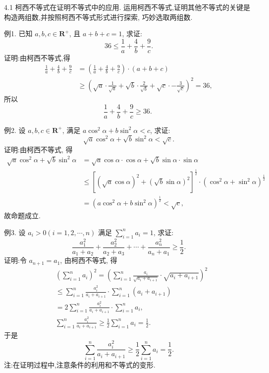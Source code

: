 
4.1 柯西不等式在证明不等式中的应用.
运用柯西不等式,证明其他不等式的关键是构造两组数,并按照柯西不等式形式进行探索, 巧妙选取两组数.



例1. 已知 $a, b, c \in \mathbf{R}^{+}$, 且 $a+b+c=1$, 求证:
$$
36 \leqslant \frac{1}{a}+\frac{4}{b}+\frac{9}{c} .
$$
证明:由柯西不等式,得
$$
\begin{aligned}
\frac{1}{a}+\frac{4}{b}+\frac{9}{c} & =\left(\frac{1}{a}+\frac{4}{b}+\frac{9}{c}\right) \cdot(a+b+c) \\
& \geqslant\left(\sqrt{a} \cdot \frac{1}{\sqrt{a}}+\sqrt{b} \cdot \frac{2}{\sqrt{b}}+\sqrt{c} \cdot-\frac{3}{\sqrt{c}}\right)^2=36,
\end{aligned}
$$
所以
$$
\frac{1}{a}+\frac{4}{b}+\frac{9}{c} \geqslant 36 \text {. }
$$



例2. 设 $a, b, c \in \mathbf{R}^{+}$, 满足 $a \cos ^2 \alpha+b \sin ^2 \alpha<c$, 求证:
$$
\sqrt{a} \cos ^2 \alpha+\sqrt{b} \sin ^2 \alpha<\sqrt{c} .
$$
证明:由柯西不等式, 得
$$
\begin{aligned}
\sqrt{a} \cos ^2 \alpha+\sqrt{b} \sin ^2 \alpha & =\sqrt{a} \cos \alpha \cdot \cos \alpha+\sqrt{b} \sin \alpha \cdot \sin \alpha \\
& \leqslant\left[(\sqrt{a} \cos \alpha)^2+(\sqrt{b} \sin \alpha)^2\right]^{\frac{1}{2}} \cdot\left(\cos ^2 \alpha+\sin ^2 \alpha\right)^{\frac{1}{2}} \\
& =\left(a \cos ^2 \alpha+b \sin ^2 \alpha\right)^{\frac{1}{2}}<\sqrt{c},
\end{aligned}
$$
故命题成立.



例3. 设 $a_i>0(i=1,2, \cdots, n)$ 满足 $\sum_{i=1}^n a_i=1$, 求证:
$$
\frac{a_1^2}{a_1+a_2}+\frac{a_2^2}{a_2+a_3}+\cdots+\frac{a_n^2}{a_n+a_1} \geqslant \frac{1}{2} .
$$
证明:令 $a_{n+1}=a_1$, 由柯西不等式, 得
$$
\begin{aligned}
&\left(\sum_{i=1}^n a_i\right)^2=\left(\sum_{i=1}^n \frac{a_i}{\sqrt{a_i+a_{i+1}}} \cdot \sqrt{a_i+a_{i+1}}\right)^2 \\
& \leqslant \sum_{i=1}^n \frac{a_i^2}{a_i+a_{i+1}} \cdot \sum_{i=1}^n\left(a_i+a_{i+1}\right) \\
&=2 \sum_{i=1}^n \frac{a_i^2}{a_i+a_{i+1}} \cdot \sum_{i=1}^n a_i, \\
& \sum_{i=1}^n \frac{a_i^2}{a_i+a_{i+1}} \geqslant \frac{1}{2} \sum_{i=1}^n a_i=\frac{1}{2} .
\end{aligned}
$$
于是
$$
\sum_{i=1}^n \frac{a_i^2}{a_i+a_{i+1}} \geqslant \frac{1}{2} \sum_{i=1}^n a_i=\frac{1}{2} .
$$
注:在证明过程中,注意条件的利用和不等式的变形.



